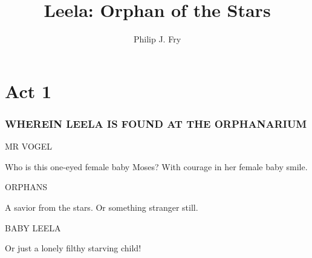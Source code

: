 \documentclass[12pt]{article}
\title{Leela: Orphan of the Stars}
\author{Philip J. Fry}
\begin{document}
\maketitle

\section{Act 1}

\subsubsection*{WHEREIN LEELA IS FOUND AT THE ORPHANARIUM}

MR VOGEL

Who is this one-eyed female baby Moses?
With courage in her female baby smile.

ORPHANS

A savior from the stars.
Or something stranger still.

BABY LEELA

Or just a lonely filthy starving child!
\end{document}
